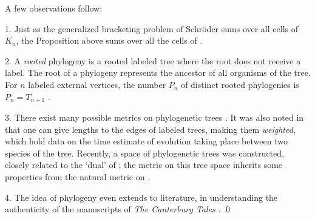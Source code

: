 \documentclass[10pt]{amsart}
\begin{document}
            \begin{rem} A few observations follow:
            
            1. Just as the generalized bracketing problem of Schr\"oder sums over all cells of $K_n$, the Proposition above sums over all the cells of .
            
            2. A {\em rooted} phylogeny is a rooted labeled tree where the root does not receive a label. The root of a phylogeny represents the ancestor of all organisms of the tree. For $n$ labeled external vertices, the number $P_n$ of distinct rooted phylogenies is $P_n = T_{n+1}$ \cite[\S2]{fr}.
            
            3. There exist many possible metrics on phylogenetic trees \cite{fr1}.  It was also noted in \cite{ph} that one can give lengths to the edges of labeled trees, making them {\em weighted}, which hold data on the time estimate of evolution taking place between two species of the tree.  Recently, a space of phylogenetic trees was constructed, closely related to the `dual' of  \cite{bhv}; the metric on this tree space inherits some properties from the natural metric on  \cite[\S2.2]{dev}.
            
            4. The idea of phylogeny even extends to literature, in understanding the authenticity of the manuscripts of {\em The Canterbury Tales} \cite{ct}.
            \qed
            \end{rem}
            
            
\end{document}
